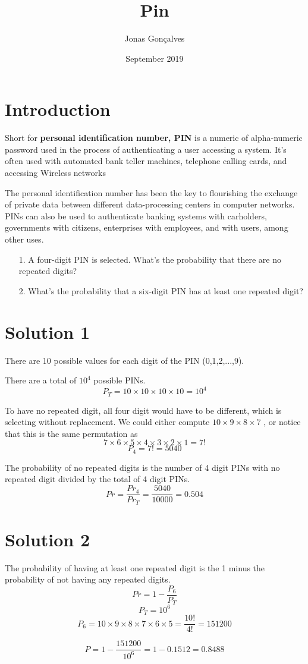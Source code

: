 \documentclass{article}
\title{Pin}
\author{Jonas Gonçalves}
\date{September 2019}
\begin{document}
\maketitle
\section{Introduction}
\qquad Short for \textbf{personal identification number, PIN} is a numeric of alpha-numeric password used in the process of authenticating a user accessing a system. It's often used with automated bank teller machines, telephone calling cards, and accessing Wireless networks

The personal identification number has been the key to flourishing the exchange of private data between different data-processing centers in computer networks. PINs can also be used to authenticate banking systems with carholders, governments with citizens, enterprises with employees, and with users, among other uses.
\begin{itemize}
    \item[1.] A four-digit PIN is selected. What's the probability that there are no repeated digits?
    
    \item[2.] What's the probability that a six-digit PIN has at least one repeated digit?
\end{itemize}

\section{Solution 1}

\quad There are 10 possible values for each digit of the PIN (0,1,2,...,9).

There are a total of \(10^4\) possible PINs.
\[P_T = 10 \times 10 \times 10 \times 10 = 10^4\]

To have no repeated digit, all four digit would have to be different, which is selecting without replacement. We could either compute \(10 \times 9 \times 8 \times 7\) , or notice that this is the same permutation as \[7 \times 6 \times 5 \times 4 \times 3 \times 2 \times 1 = 7!\]
\[P_4 = 7! = 5040\]

The probability of no repeated digits is the number of 4 digit PINs with no repeated digit divided by the total of 4 digit PINs.
\[Pr = \frac{Pr_4}{Pr_T} = \frac{5040}{10000} = 0.504\]

\section{Solution 2}
The probability of having at least one repeated digit is the 1 minus the probability of not having any repeated digits.
\[Pr = 1 - \frac{P_6}{P_T}\]
\[P_T = 10^6\]
\[P_6 = 10 \times 9 \times 8 \times 7 \times 6 \times 5 = \frac{10!}{4!} = 151200\]

\[P = 1 - \frac{151200}{10^6} = 1 - 0.1512 = 0.8488\]
\end{document}
